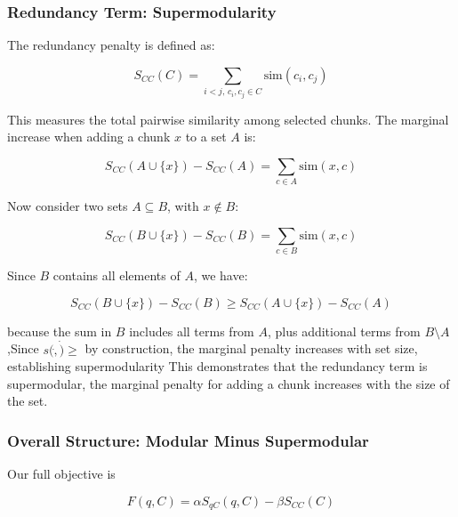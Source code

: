 \documentclass[11pt]{article}
\begin{document}
\subsubsection{Redundancy Term: Supermodularity}

The redundancy penalty is defined as:

\begin{equation}
  \label{eq:example}
  S_{CC}(C) = \sum_{i<j,\, c_i, c_j \in C} \mathrm{sim}(c_i, c_j)
\end{equation}

This measures the total pairwise similarity among selected chunks. The marginal increase when adding a chunk $x$ to a set $A$ is:


\begin{equation}
  \label{eq:example}
  S_{CC}(A \cup \{x\}) - S_{CC}(A) = \sum_{c \in A} \mathrm{sim}(x, c)
\end{equation}

Now consider two sets $A \subseteq B$, with $x \notin B$:

\begin{equation}
  \label{eq:example}
  S_{CC}(B \cup \{x\}) - S_{CC}(B) = \sum_{c \in B} \mathrm{sim}(x, c)
\end{equation}

Since $B$ contains all elements of $A$, we have:

\begin{equation}
  \label{eq:example}
  S_{CC}(B \cup \{x\}) - S_{CC}(B) \geq S_{CC}(A \cup \{x\}) - S_{CC}(A)
\end{equation}

because the sum in $B$ includes all terms from $A$, plus additional terms from $B \setminus A$ ,Since $s(\dot,\dot)\ge$ by construction, the marginal penalty increases with set size, establishing supermodularity This demonstrates that the redundancy term is supermodular, the marginal penalty for adding a chunk increases with the size of the set.

\subsubsection{Overall Structure: Modular Minus Supermodular}

Our full objective is

\begin{equation}
  \label{eq:example}
  F(q, C) = \alpha S_{qC}(q, C) - \beta S_{CC}(C)
\end{equation}
\end{document}
